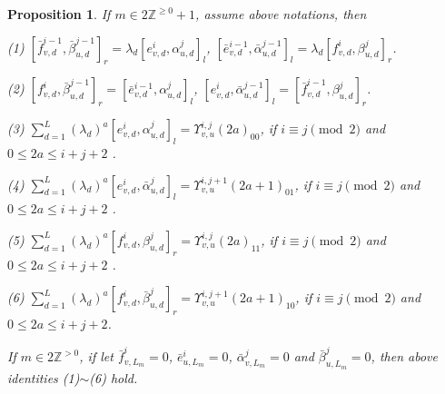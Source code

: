 \def\CTEXPreproc{Created by ctex v0.2.12, don't edit!}\documentclass[11pt]{article}
\newtheorem{prop}{Proposition}[section]
\begin{document}
 \begin{prop} If $m\in 2\mathbb{Z}^{\geq0}+1$, assume above notations, then

\noindent (1) $ [ \bar{f}^{i-1}_{v,d} , \bar{\beta}^{j-1}_{u,d}    ]_r = \lambda_d [ e^i _{v,d} , \alpha^j _{u,d}   ]_l  $,
 $[\bar{e}^{i-1}_{v,d} ,\bar{\alpha}^{j-1} _{u,d} ]_l = \lambda_d [ f^i _{v,d} , \beta^j _{u,d}   ]_r   $.

 \noindent(2) $ [ f^i _{v,d} , \bar{\beta}^{j-1}_{u,d}  ]_r =[ \bar{e}^{i-1} _{v,d} , \alpha^j _{u,d}     ]_l  $,
 $[ e^i _{v,d} , \bar{\alpha}^{j-1}_{u,d}  ]_l = [ \bar{f}^{i-1}_{v,d} , \beta^j _{u,d}    ]_r $.

\noindent (3) $\sum^{L}_{d=1} (\lambda_d )^a [e^i _{v,d} ,\alpha^j _{u,d}   ]_l = \Upsilon^{i,j}_{v,u}(2a)_{00}  $,  if  $i\equiv j \pmod{2}$ and
 $0\leq 2a \leq  i+j+2 $  .


\noindent (4) $\sum^{L}_{d=1} (\lambda_d )^a [e^i _{v,d} ,\bar{\alpha}^j _{u,d}   ]_l = \Upsilon^{i, j+1}_{v,u}(2a+1)_{01}  $, if $i\equiv j \pmod{2}$ and
 $ 0\leq 2a\leq i+j+2  $ .




 \noindent(5)  $\sum^{L}_{d=1} (\lambda_d )^a [f^i _{v,d} ,\beta^j _{u,d}   ]_r = \Upsilon^{i,j}_{v,u}(2a)_{11}  $, if $i\equiv j \pmod{2}$ and
 $0\leq 2a \leq i+j+2  $ .



\noindent (6) $\sum^{L}_{d=1} (\lambda_d )^a [f^i _{v,d} ,\bar{\beta}^j _{u,d}   ]_r = \Upsilon^{i, j+1}_{v,u}(2a+1)_{10}  $, if  $i\equiv j \pmod{2}$ and
 $ 0\leq 2a\leq i+j+2   $.





 If $m\in 2\mathbb{Z}^{>0}$, if let $\bar{f}^i _{v, L_m }=0 $, $\bar{e}^i _{u, L_m }  =0 $, $\bar{\alpha}^j _{v,L_m }=0 $ and $\bar{\beta}^j _{u,L_m }=0$, then above identities (1)$\sim$(6) hold.


 \end{prop}
\end{document}
